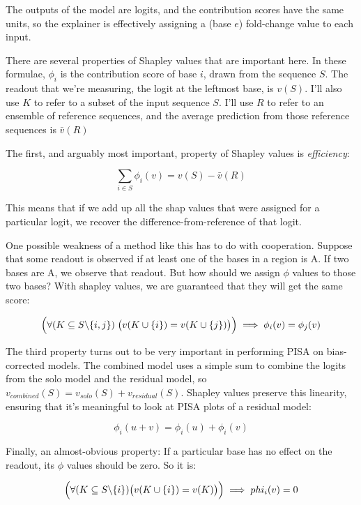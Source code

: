 \documentclass{article}
\begin{document}
The outputs of the model are logits, and the contribution scores have the same
units, so the explainer is effectively assigning a (base $e$) fold-change value
to each input.

There are several properties of Shapley values that are important here.
In these formulae, $\phi_i$ is the contribution score of base $i$, drawn from
the sequence $S$.
The readout that we're measuring, the logit at the leftmost base, is $v(S)$.
I'll also use $K$ to refer to a subset of the input sequence $S$.
I'll use $R$ to refer to an ensemble of reference sequences, and the average
prediction from those reference sequences is $\bar{v}(R)$

The first, and arguably most important, property of Shapley values is
\emph{efficiency}:

\begin{equation}
    \sum_{i \in S} \phi_i(v) = v(S) - \bar{v}(R)
\end{equation}

This means that if we add up all the shap values that were assigned for a
particular logit, we recover the difference-from-reference of that logit.

One possible weakness of a method like this has to do with cooperation.
Suppose that some readout is observed if at least one of the bases in a region
is A.
If two bases are A, we observe that readout.
But how should we assign $\phi$ values to those two bases?
With shapley values, we are guaranteed that they will get the same score:

\begin{equation}
    \Bigl( \forall (K \subseteq S \backslash \{i,j\})\;
    \bigl(v(K \cup \{i\}) = v(K \cup \{j\})\bigr) \Bigr)
    \\
    \implies \phi_i(v) = \phi_j(v)
\end{equation}

The third property turns out to be very important in performing PISA on
bias-corrected models.
The combined model uses a simple sum to combine the logits from the solo model
and the residual model, so $v_{combined}(S) = v_{solo}(S) + v_{residual}(S)$.
Shapley values preserve this linearity, ensuring that it's meaningful to look
at PISA plots of a residual model:

\begin{equation}
    \phi_i(u + v) = \phi_i(u) + \phi_i(v)
\end{equation}

Finally, an almost-obvious property: If a particular base has no effect on the
readout, its $\phi$ values should be zero. So it is:

\begin{equation}
    \Bigl( \forall (K \subseteq S \backslash \{i\})
    \bigl( v(K \cup \{i\}) = v(K)\bigr)\Bigr)
    \\
    \implies phi_i(v) = 0
\end{equation}
\end{document}
